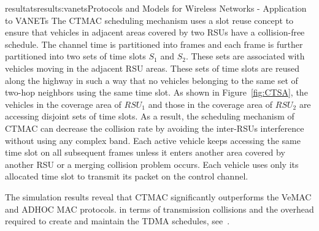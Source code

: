 \documentclass{ra2016}
\begin{document}
\begin{module}{resultats}{results:vanets}{Protocols and Models for Wireless Networks - Application to VANETs}
The CTMAC scheduling mechanism uses a slot reuse concept 
to ensure that vehicles in adjacent areas covered by two RSUs have 
a collision-free schedule. The channel time is partitioned into frames and
each frame is further partitioned into two sets of time slots $S_1$ and $S_2$. 
These sets are associated with vehicles moving in the adjacent RSU areas. 
These sets of time slots are reused along the highway in such a way that no vehicles belonging to 
the same set of two-hop 
neighbors using the same time slot. As shown in Figure~\ref{fig:CTSA}, the vehicles in 
the coverage area of $RSU_1$ and those in the coverage area of $RSU_2$ are
accessing disjoint sets of time slots. As a result, the scheduling mechanism of 
CTMAC can decrease the collision rate by avoiding the inter-RSUs interference 
without using any complex band.  Each active vehicle keeps accessing the same 
time slot on all subsequent frames unless it enters another area covered by another 
RSU or a merging collision problem occurs. Each vehicle uses only its allocated 
time slot to transmit its packet on the control channel.

The simulation results
reveal that CTMAC significantly outperforms the VeMAC and
ADHOC MAC protocols. in terms of transmission collisions
and the overhead required to create and maintain the TDMA
schedules, see~\cite{hadded:hal-01379219}. 


\end{module}
\end{document}
